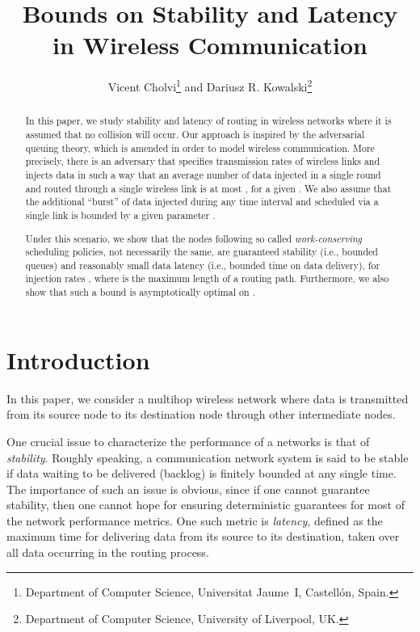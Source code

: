 \documentclass[journal,twocolumn]{./IEEEtran}
\begin{document}
\title{Bounds on Stability and Latency\\ in Wireless Communication}
\author{Vicent Cholvi\thanks{Department of Computer Science, Universitat Jaume~I, Castell\'on, Spain.}
and
Dariusz R. Kowalski\thanks{Department of Computer Science, University of Liverpool, UK.}
}

\date{}

\maketitle

\begin{abstract}
In this paper, we study stability and latency of routing in wireless networks where it is assumed that no collision will occur.  Our approach is inspired by the adversarial queuing theory, which is amended in order to model wireless communication. More precisely, there is an adversary that specifies transmission rates of wireless links and injects data in such a way that an average number of data injected in a single round and routed through a single
wireless link is at most , for a given . We also assume that the additional ``burst'' of data injected during any time interval and scheduled via a single link is bounded by a given parameter .

Under this scenario, we show that the nodes following so called {\em work-conserving} scheduling policies, not necessarily 
the same, are guaranteed stability (i.e., bounded queues) and reasonably small data latency (i.e., bounded time on data delivery), 
for injection rates , where  is the maximum length of a routing path. Furthermore, we also show that such a bound is asymptotically optimal on .
\end{abstract}











\section{Introduction}

In this paper, we consider a multihop wireless network where data is transmitted from its source node to its destination node through other intermediate nodes.


One crucial issue to characterize the performance of a networks is that of \emph{stability}. Roughly speaking, a communication network system is said to be stable if data waiting to be delivered (backlog) is finitely bounded at any 
single
time. The importance of such an issue is obvious, since if one cannot guarantee stability, then one cannot hope 
for ensuring
deterministic guarantees for most of the network performance metrics.
One such metric is {\em latency}, defined as the maximum time
for delivering data from its source to its destination, taken over all data
occurring in the routing process.
\end{document}
